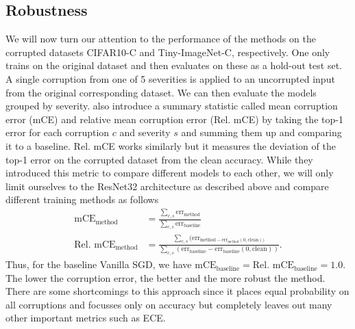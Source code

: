 \documentclass[a4paper, 11pt, oneside]{scrartcl}
\theoremstyle{break}
\numberwithin{equation}{section}
\begin{document}
		\subsection{Robustness}
			We will now turn our attention to the performance of the methods on the corrupted datasets CIFAR10-C and Tiny-ImageNet-C, respectively. 
			One only trains on the original dataset and then evaluates on these as a hold-out test set.
			A single corruption from one of 5 severities is applied to an uncorrupted input from the original corresponding dataset. 
			We can then evaluate the models grouped by severity.
			\parencite{HD19} also introduce a summary statistic called mean corruption error (mCE) and relative mean corruption error (Rel. mCE) by taking the top-1 error for each corruption $c$ and severity $s$ and summing them up and comparing it to a baseline.
			Rel. mCE works similarly but it measures the deviation of the top-1 error on the corrupted dataset from the clean accuracy. 
			While they introduced this metric to compare different models to each other, we will only limit ourselves to the ResNet32 architecture as described above and compare different training methods as follows
			\begin{align*}
				\text{mCE}_{\text{method}} &= \frac{\sum_{c, s} \text{err}_{\text{method}}}{ \sum_{c, s} \text{err}_{\text{baseline}}} \\
				\text{Rel. mCE}_{\text{method}} &= \frac{\sum_{c, s} (\text{err}_{\text{method} - \text{err}_{\text{method}}(0, \text{clean}))}}{ \sum_{c, s} (\text{err}_{\text{baseline}} - \text{err}_{\text{baseline}}(0, \text{clean}))}.
			\end{align*}
			Thus, for the baseline Vanilla SGD, we have $\text{mCE}_{\text{baseline}} = \text{Rel. mCE}_{\text{baseline}} = 1.0$.
			The lower the corruption error, the better and the more robust the method. 
			There are some shortcomings to this approach since it places equal probability on all corruptions and focusses only on accuracy but completely leaves out many other important metrics such as ECE. 
\end{document}
